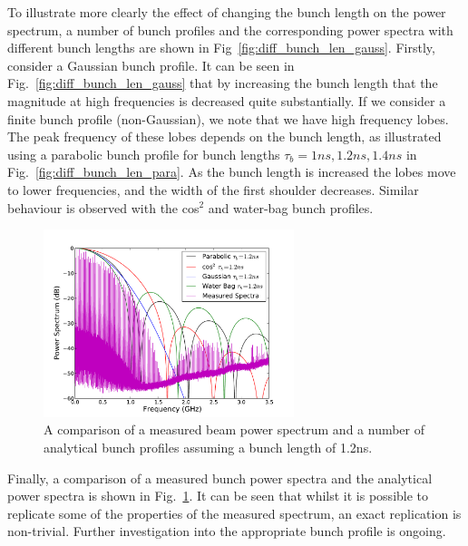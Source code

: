 \documentclass{cernyrep}
\begin{document}
To illustrate more clearly the effect of changing the bunch length on the power spectrum, a number of bunch profiles and the corresponding power spectra with different bunch lengths are shown in Fig~\ref{fig:diff_bunch_len_gauss}. Firstly, consider a Gaussian bunch profile. It can be seen in Fig.~\ref{fig:diff_bunch_len_gauss} that by increasing the bunch length that the magnitude at high frequencies is decreased quite substantially. If we consider a finite bunch profile (non-Gaussian), we note that we have high frequency lobes. The peak frequency of these lobes depends on the bunch length, as illustrated using a parabolic bunch profile for bunch lengths $\tau_{b} = 1ns, 1.2ns, 1.4ns$ in Fig.~\ref{fig:diff_bunch_len_para}. As the bunch length is increased the lobes move to lower frequencies, and the width of the first shoulder decreases. Similar behaviour is observed with the cos$^{2}$ and water-bag bunch profiles.

\begin{figure}
\begin{center}
\includegraphics[width=0.65\textwidth]{figures/beam_spectra_power_12ns.pdf}
\end{center}
\caption{A comparison of a measured beam power spectrum and a number of analytical bunch profiles assuming a bunch length of 1.2ns.}
\label{fig:power_all}
\end{figure}

Finally, a comparison of a measured bunch power spectra and the analytical power spectra is shown in Fig.~\ref{fig:power_all}. It can be seen that whilst it is possible to replicate some of the properties of the measured spectrum, an exact replication is non-trivial. Further investigation into the appropriate bunch profile is ongoing.



\end{document}
